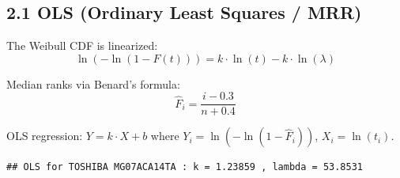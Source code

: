 \documentclass[
]{article}
\newenvironment{Shaded}{\begin{snugshade}}{\end{snugshade}}
\newcommand{\CommentTok}[1]{\textcolor[rgb]{0.56,0.35,0.01}{\textit{#1}}}
\newcommand{\DecValTok}[1]{\textcolor[rgb]{0.00,0.00,0.81}{#1}}
\newcommand{\FloatTok}[1]{\textcolor[rgb]{0.00,0.00,0.81}{#1}}
\newcommand{\FunctionTok}[1]{\textcolor[rgb]{0.13,0.29,0.53}{\textbf{#1}}}
\newcommand{\NormalTok}[1]{#1}
\newcommand{\OtherTok}[1]{\textcolor[rgb]{0.56,0.35,0.01}{#1}}
\newcommand{\SpecialCharTok}[1]{\textcolor[rgb]{0.81,0.36,0.00}{\textbf{#1}}}
\newcommand{\StringTok}[1]{\textcolor[rgb]{0.31,0.60,0.02}{#1}}
\begin{document}
\subsection{2.1 OLS (Ordinary Least Squares /
MRR)}\label{ols-ordinary-least-squares-mrr}

The Weibull CDF is linearized:
\[\ln(-\ln(1 - F(t))) = k \cdot \ln(t) - k \cdot \ln(\lambda)\]

Median ranks via Benard's formula:
\[\hat{F}_i = \frac{i - 0.3}{n + 0.4}\]

OLS regression: \(Y = k \cdot X + b\) where
\(Y_i = \ln(-\ln(1-\hat{F}_i))\), \(X_i = \ln(t_i)\).

\begin{Shaded}
\end{Shaded}

\begin{verbatim}
## OLS for TOSHIBA MG07ACA14TA : k = 1.23859 , lambda = 53.8531
\end{verbatim}
\end{document}
